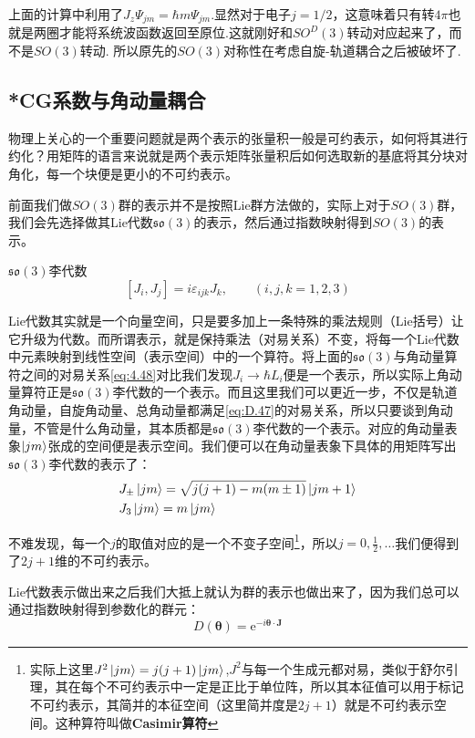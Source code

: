 上面的计算中利用了$J_z\Psi_{jm}=\hbar m\Psi_{jm}$.显然对于电子$j=1/2$，这意味着只有转$4\pi$也就是两圈才能将系统波函数返回至原位.这就刚好和$SO^D(3)$转动对应起来了，而不是$SO(3)$转动. 所以原先的$SO(3)$对称性在考虑自旋-轨道耦合之后被破坏了.
\subsection{*CG系数与角动量耦合}
物理上关心的一个重要问题就是两个表示的张量积一般是可约表示，如何将其进行约化？用矩阵的语言来说就是两个表示矩阵张量积后如何选取新的基底将其分块对角化，每一个块便是更小的不可约表示。

前面我们做$SO(3)$群的表示并不是按照Lie群方法做的，实际上对于$SO(3)$群，我们会先选择做其Lie代数$\mathfrak{so}(3)$的表示，然后通过指数映射得到$SO(3)$的表示。
\begin{define}{$\mathfrak{so}(3)$李代数}
	\begin{equation}
		\label{eq:D.47}
		[J_i,J_j]=i\varepsilon_{ijk}J_k,\qquad(i,j,k=1,2,3)
	\end{equation}
\end{define}

Lie代数其实就是一个向量空间，只是要多加上一条特殊的乘法规则（Lie括号）让它升级为代数。而所谓表示，就是保持乘法（对易关系）不变，将每一个Lie代数中元素映射到线性空间（表示空间）中的一个算符。将上面的$\mathfrak{so}(3)$与角动量算符之间的对易关系\ref{eq:4.48}对比我们发现$J_i\to\hbar L_i$便是一个表示，所以实际上角动量算符正是$\mathfrak{so}(3)$李代数的一个表示。而且这里我们可以更近一步，不仅是轨道角动量，自旋角动量、总角动量都满足\ref{eq:D.47}的对易关系，所以只要谈到角动量，不管是什么角动量，其本质都是$\mathfrak{so}(3)$李代数的一个表示。对应的角动量表象$\ket{jm}$张成的空间便是表示空间。我们便可以在角动量表象下具体的用矩阵写出$\mathfrak{so}(3)$李代数的表示了：
\begin{align}
	&\label{eq:D.48}J_\pm\ket{jm}=\sqrt{j(j+1)-m(m\pm1)}\ket{jm+1}\\
	&\label{eq:D.49}J_3\ket{jm}=m\ket{jm}
\end{align}

不难发现，每一个$j$的取值对应的是一个不变子空间\footnote{实际上这里$J^2\ket{jm}=j(j+1)\ket{jm}$,$J^2$与每一个生成元都对易，类似于舒尔引理，其在每个不可约表示中一定是正比于单位阵，所以其本征值可以用于标记不可约表示，其简并的本征空间（这里简并度是$2j+1$）就是不可约表示空间。这种算符叫做\textbf{Casimir算符}}，所以$j=0,\frac{1}{2},\ldots$我们便得到了$2j+1$维的不可约表示。

Lie代数表示做出来之后我们大抵上就认为群的表示也做出来了，因为我们总可以通过指数映射得到参数化的群元：
\begin{equation}
	D(\mathbf{\theta})=\mathrm{e}^{-i\mathbf{\theta}\cdot\mathbf{J}}
\end{equation}


